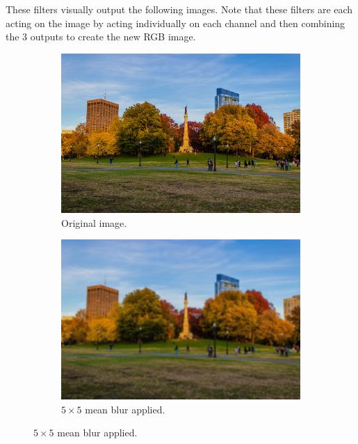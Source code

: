 \documentclass{article}
\begin{document}
\begin{example}
    These filters visually output the following images. Note that these filters are each acting on the image by acting individually on each channel and then combining the 3 outputs to create the new RGB image. 
    \begin{figure}[H]
        \centering
        \begin{subfigure}[b]{0.32\textwidth}
        \centering
            \includegraphics[width=\textwidth]{img/03_CNN/Park_Full.png}
            \caption{Original image. }
            \label{fig:original_image}
        \end{subfigure}
        \begin{subfigure}[b]{0.32\textwidth}
        \centering
            \includegraphics[width=\textwidth]{img/03_CNN/Mean_Blur.png}
            \caption{$5 \times 5$ mean blur applied. }
            \label{fig:mean_blur_image}
        \end{subfigure}

\end{figure}
\end{example}
\end{document}
